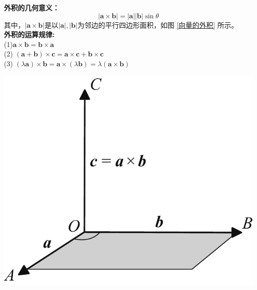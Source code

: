 \noindent
\begin{minipage}{0.6\linewidth}
\textbf{外积的几何意义：}
\begin{equation}
	|\boldsymbol{a}\times\boldsymbol{b}|=|\boldsymbol{a}||\boldsymbol{b}|\sin \theta
\end{equation}
其中，$|\boldsymbol{a}\times\boldsymbol{b}|$是以$|\boldsymbol{a}|,|\boldsymbol{b}|$为邻边的平行四边形面积，如图 \ref{向量的外积} 所示。\\
\textbf{外积的运算规律:}\\
\hspace*{2em}(1)\hspace*{0.5em}\qquad $\boldsymbol{a}\times\boldsymbol{b}=\boldsymbol{b}\times\boldsymbol{a}$\\
\hspace*{2em}(2)\hspace*{0.5em}\qquad
$(\boldsymbol{a}+\boldsymbol{b})\times\boldsymbol{c}=\boldsymbol{a}\times\boldsymbol{c}+\boldsymbol{b}\times\boldsymbol{c}$\\
\hspace*{2em}(3)\hspace*{0.5em}\qquad
$(\lambda\boldsymbol{a})\times\boldsymbol{b}=\boldsymbol{a}\times(\lambda\boldsymbol{b})=\lambda(\boldsymbol{a}\times\boldsymbol{b})$
\end{minipage}
\begin{minipage}{0.4\linewidth}
	\centering
	\includegraphics[width = 0.72\linewidth]{pic/C-5/veccross}
	\vspace*{-1em}
	\label{向量的外积}
\end{minipage}

